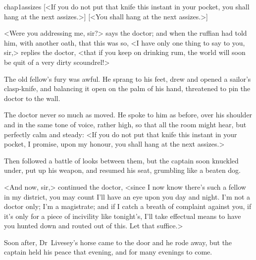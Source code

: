 \begin{bwbigpic}
	[\basicscale]
	{chap1assizes}
	[<If you do not put that knife this instant in your pocket, you shall hang at the next assizes.>]
	[<You shall hang at the next assizes.>]
\end{bwbigpic}

<Were you addressing me, sir?> says the doctor; and when the ruffian had told him, with another oath, that this was so, <I have only one thing to say to you, sir,> replies the doctor, <that if you keep on drinking rum, the world will soon be quit of a very dirty scoundrel!>

The old fellow's fury was awful. He sprang to his feet, drew and opened a sailor's clasp-knife, and balancing it open on the palm of his hand, threatened to pin the doctor to the wall.

The doctor never so much as moved. He spoke to him as before, over his shoulder and in the same tone of voice, rather high, so that all the room might hear, but perfectly calm and steady: <If you do not put that knife this instant in your pocket, I promise, upon my honour, you shall hang at the next assizes.>


Then followed a battle of looks between them, but the captain soon knuckled under, put up his weapon, and resumed his seat, grumbling like a beaten dog.

<And now, sir,> continued the doctor, <since I now know there's such a fellow in my district, you may count I'll have an eye upon you day and night. I'm not a doctor only; I'm a magistrate; and if I catch a breath of complaint against you, if it's only for a piece of incivility like tonight's, I'll take effectual means to have you hunted down and routed out of this. Let that suffice.>

Soon after, Dr~Livesey's horse came to the door and he rode away, but the captain held his peace that evening, and for many evenings to come.
